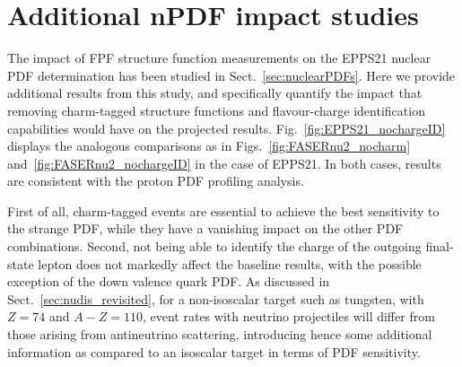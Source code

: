 \section{Additional nPDF impact studies}
\label{app:nPDF_impact_appendix}

The impact of FPF structure function measurements on the
EPPS21 nuclear PDF determination has been studied in Sect.~\ref{sec:nuclearPDFs}.
%
Here we provide additional results from this study, and specifically quantify the impact
that removing charm-tagged structure functions and flavour-charge
identification capabilities would have on the projected results.
%
Fig.~\ref{fig:EPPS21_nochargeID} displays
the analogous comparisons as in Figs.~\ref{fig:FASERnu2_nocharm}
and~\ref{fig:FASERnu2_nochargeID} in the case of EPPS21.
%
In both cases, results are consistent with the proton PDF profiling analysis.

First of all, charm-tagged events are essential to achieve the best
sensitivity to the strange PDF, while they have a vanishing impact on the
other PDF combinations.
%
Second, not being able to identify the charge of the outgoing final-state lepton
does not markedly affect  the baseline results, with the possible exception
of the down valence quark PDF.
%
As discussed in Sect.~\ref{sec:nudis_revisited}, for a non-isoscalar target
such as tungsten, with $Z=74$ and $A-Z=110$, event rates with neutrino projectiles
will differ from those arising from antineutrino scattering, introducing
hence some additional information as compared to an isoscalar target in terms
of PDF sensitivity.

